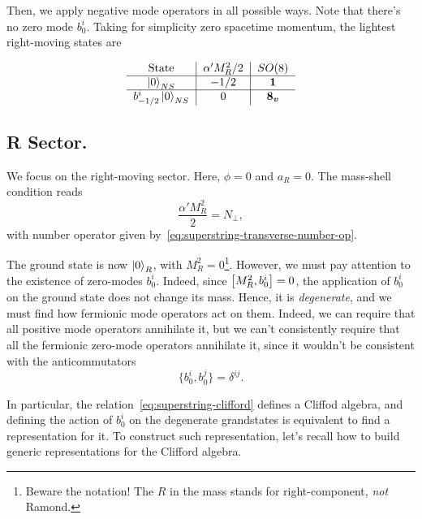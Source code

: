 Then, we apply negative mode operators in all possible ways. Note that there's no zero mode $b^i_0$. Taking for simplicity zero spacetime momentum, the lightest right-moving states are

\begin{equation}\label{eq:table-NS}
\begin{tabular}{c|c|c} %
    State & $\alpha' M^2_R / 2$ & $SO(8)$ \\ \hline
    $\ket{0}_{NS}$   & $-1/2$   & $\i$   \\ \hline
    $b^i_{-1/2} \ket{0}_{NS}$   & $0$   & $\v$  %
\end{tabular}
\end{equation}

\subsection{R Sector.}
We focus on the right-moving sector. Here, $\phi = 0$ and $a_R = 0$. The mass-shell condition reads
\begin{equation}\label{eq:R-mass-shell}
    \frac{\alpha' M^2_R}{2} = N_\perp,
\end{equation}
with number operator given by~\eqref{eq:superstring-transverse-number-op}.

The ground state is now $\ket{0}_R$, with $M_R^2 = 0$\footnote{Beware the notation! The $R$ in the mass stands for right-component, \emph{not} Ramond.}. However, we must pay attention to the existence of zero-modes $b^i_0$. Indeed, since $\comm{M^2_R}{b^i_0} = 0$, the application of $b^i_0$ on the ground state does not change its mass. Hence, it is \emph{degenerate}, and we must find how fermionic mode operators act on them. Indeed, we can require that all positive mode operators annihilate it, but we can't consistently require that all the fermionic zero-mode operators annihilate it, since it wouldn't be consistent with the anticommutators
\begin{equation}\label{eq:superstring-clifford}
    \{ b^i_0, b^j_0 \} = \delta^{ij}.
\end{equation}

In particular, the relation~\eqref{eq:superstring-clifford} defines a Cliffod algebra, and defining the action of $b^i_0$ on the degenerate grandstates is equivalent to find a representation for it. To construct such representation, let's recall how to build generic representations for the Clifford algebra.

